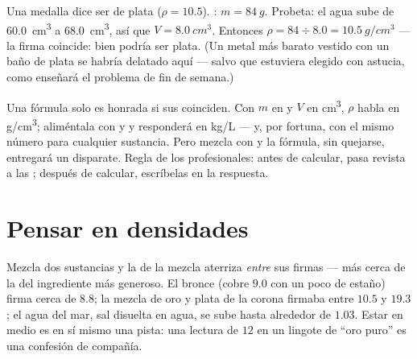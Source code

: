 \begin{example}\label{ex:g7:volume-mass-density:solid}
Una medalla dice ser de plata ($\rho = 10.5$). :
$m = \qty{84}{g}$. Probeta: el agua sube de \qty{60.0}{cm^3} a
\qty{68.0}{cm^3}, así que $V = \qty{8.0}{cm^3}$. Entonces
$\rho = 84 \div 8.0 = \qty{10.5}{g/cm^3}$ --- la firma coincide: bien
podría ser plata. (Un metal más barato vestido con un baño de plata se
habría delatado aquí --- salvo que estuviera elegido con astucia, como
enseñará el problema de fin de semana.)
\end{example}

\begin{remark}\label{rem:g7:volume-mass-density:units}
Una fórmula solo es honrada si sus  coinciden. Con $m$ en
 y $V$ en \unit{cm^3}, $\rho$ habla en \unit{g/cm^3};
aliméntala con  y  y responderá en
\unit{kg/L} --- y, por fortuna, con el mismo número para cualquier
sustancia. Pero mezcla  con  y la fórmula, sin
quejarse, entregará un disparate. Regla de los profesionales: antes de
calcular, pasa revista a las ; después de calcular,
escríbelas en la respuesta.
\end{remark}

\section{Pensar en densidades}

\begin{example}\label{ex:g7:volume-mass-density:alloys}
Mezcla dos sustancias y la  de la mezcla aterriza
\emph{entre} sus firmas --- más cerca de la del ingrediente más
generoso. El bronce (cobre $9.0$ con un poco de estaño) firma cerca de
$8.8$; la mezcla de oro y plata de la corona firmaba entre $10.5$ y
$19.3$; el agua del mar, sal disuelta en agua, se sube hasta alrededor
de $1.03$. Estar en medio es en sí mismo una pista: una lectura de $12$
en un lingote de ``oro puro'' es una confesión de compañía.
\end{example}

